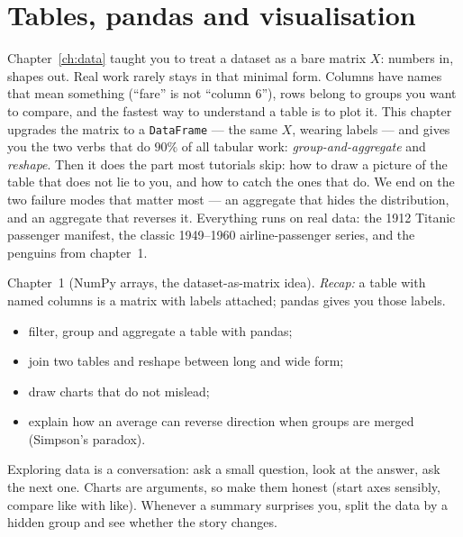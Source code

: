\chapter{Tables, pandas and visualisation}\label{ch:tables}

Chapter~\ref{ch:data} taught you to treat a dataset as a bare matrix $X$:
numbers in, shapes out. Real work rarely stays in that minimal form. Columns
have names that mean something (``fare'' is not ``column 6''), rows belong to
groups you want to compare, and the fastest way to understand a table is to
plot it. This chapter upgrades the matrix to a \texttt{DataFrame} --- the same
$X$, wearing labels --- and gives you the two verbs that do $90\%$ of all
tabular work: \emph{group-and-aggregate} and \emph{reshape}. Then it does the
part most tutorials skip: how to draw a picture of the table that does not
lie to you, and how to catch the ones that do. We end on the two failure
modes that matter most --- an aggregate that hides the distribution, and an
aggregate that reverses it. Everything runs on real data: the 1912 Titanic
passenger manifest, the classic 1949--1960 airline-passenger series, and the
penguins from chapter~1.

\begin{rulebox}
Chapter~1 (NumPy arrays, the dataset-as-matrix idea). \emph{Recap:} a table with named columns is a matrix with labels attached; pandas gives you those labels.
\end{rulebox}
\begin{wins}
\begin{itemize}
\item filter, group and aggregate a table with pandas;
\item join two tables and reshape between long and wide form;
\item draw charts that do not mislead;
\item explain how an average can reverse direction when groups are merged (Simpson's paradox).
\end{itemize}
\end{wins}
\begin{principle}
Exploring data is a conversation: ask a small question, look at the answer, ask the next one. Charts are arguments, so make them honest (start axes sensibly, compare like with like). Whenever a summary surprises you, split the data by a hidden group and see whether the story changes.
\end{principle}

